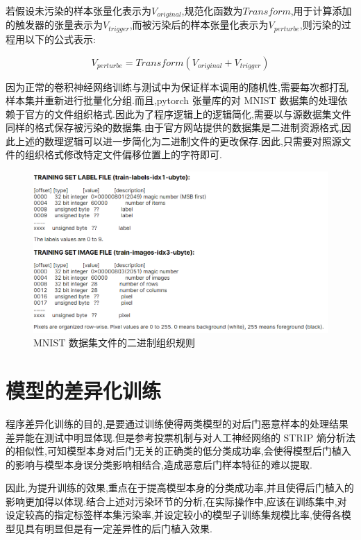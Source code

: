 若假设未污染的样本张量化表示为$V_{original}$,规范化函数为$Transform$,用于计算添加的触发器的张量表示为$V_{trigger}$,而被污染后的样本张量化表示为$V_{perturbe}$,则污染的过程用以下的公式表示:

\begin{equation}
V_{perturbe}=Transform(V_{original}+V_{trigger}) 
\end{equation}

因为正常的卷积神经网络训练与测试中为保证样本调用的随机性,需要每次都打乱样本集并重新进行批量化分组.而且,pytorch 张量库的对 MNIST 数据集的处理依赖于官方的文件组织格式.因此为了程序逻辑上的逻辑简化,需要以与源数据集文件同样的格式保存被污染的数据集.由于官方网站提供的数据集是二进制资源格式,因此上述的数理逻辑可以进一步简化为二进制文件的更改保存.因此,只需要对照源文件的组织格式修改特定文件偏移位置上的字符即可.

\begin{figure}[H]
	\centering
	\includegraphics[scale=0.5]{Figures/rule.png}
	\caption{MNIST 数据集文件的二进制组织规则}
\end{figure}

\section{模型的差异化训练}

程序差异化训练的目的,是要通过训练使得两类模型的对后门恶意样本的处理结果差异能在测试中明显体现.但是参考投票机制与对人工神经网络的 STRIP 熵分析法的相似性,可知模型本身对后门无关的正确类的低分类成功率,会使得模型后门植入的影响与模型本身误分类影响相结合,造成恶意后门样本特征的难以提取.

因此,为提升训练的效果,重点在于提高模型本身的分类成功率,并且使得后门植入的影响更加得以体现.结合上述对污染环节的分析,在实际操作中,应该在训练集中,对设定较高的指定标签样本集污染率,并设定较小的模型子训练集规模比率,使得各模型见具有明显但是有一定差异性的后门植入效果.

